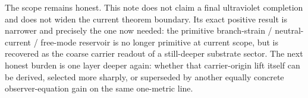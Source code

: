 \documentclass[11pt]{article}
\begin{document}
The scope remains honest. This note does not claim a final ultraviolet completion and does not widen the current theorem boundary. Its exact positive result is narrower and precisely the one now needed: the primitive branch-strain / neutral-current / free-mode reservoir is no longer primitive at current scope, but is recovered as the coarse carrier readout of a still-deeper substrate sector. The next honest burden is one layer deeper again: whether that carrier-origin lift itself can be derived, selected more sharply, or superseded by another equally concrete observer-equation gain on the same one-metric line.
\end{document}
